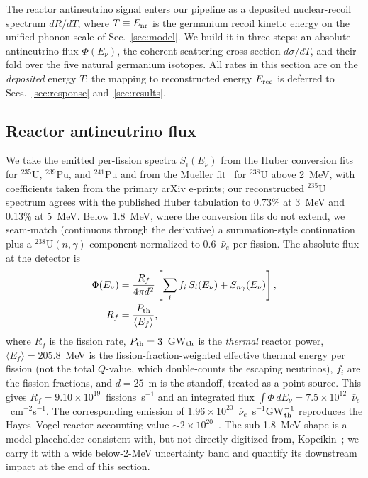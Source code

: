 The reactor antineutrino signal enters our pipeline as a deposited nuclear-recoil spectrum $dR/dT$, where $T\equiv E_{\rm nr}$ is the germanium recoil kinetic energy on the unified phonon scale of Sec.~\ref{sec:model}. We build it in three steps: an absolute antineutrino flux $\Phi(E_\nu)$, the coherent-scattering cross section $d\sigma/dT$, and their fold over the five natural germanium isotopes. All rates in this section are on the \emph{deposited} energy $T$; the mapping to reconstructed energy $E_{\rm rec}$ is deferred to Secs.~\ref{sec:response} and~\ref{sec:results}.

\subsection{Reactor antineutrino flux}

We take the emitted per-fission spectra $S_i(E_\nu)$ from the Huber conversion fits~\cite{huber2011} for ${}^{235}$U, ${}^{239}$Pu, and ${}^{241}$Pu and from the Mueller fit~\cite{mueller2011} for ${}^{238}$U above 2~MeV, with coefficients taken from the primary arXiv e-prints; our reconstructed ${}^{235}$U spectrum agrees with the published Huber tabulation to 0.73\% at 3~MeV and 0.13\% at 5~MeV. Below 1.8~MeV, where the conversion fits do not extend, we seam-match (continuous through the derivative) a summation-style continuation plus a ${}^{238}$U$(n,\gamma)$ component normalized to 0.6~$\bar\nu_e$ per fission. The absolute flux at the detector is
\begin{equation}
\begin{aligned}
\Phi(E_\nu) &= \frac{R_f}{4\pi d^2}\left[\sum_i f_i\, S_i(E_\nu) + S_{n\gamma}(E_\nu)\right],\\
R_f &= \frac{P_{\rm th}}{\langle E_f\rangle},
\end{aligned}
\label{eq:flux}
\end{equation}
where $R_f$ is the fission rate, $P_{\rm th}=3$~GW$_{\rm th}$ is the \emph{thermal} reactor power, $\langle E_f\rangle=205.8$~MeV is the fission-fraction-weighted effective thermal energy per fission (not the total $Q$-value, which double-counts the escaping neutrinos), $f_i$ are the fission fractions, and $d=25$~m is the standoff, treated as a point source. This gives $R_f=9.10\times10^{19}$~fissions~s$^{-1}$ and an integrated flux $\int\Phi\,dE_\nu = 7.5\times10^{12}$~$\bar\nu_e$~cm$^{-2}$s$^{-1}$. The corresponding emission of $1.96\times10^{20}$~$\bar\nu_e$~s$^{-1}$GW$_{\rm th}^{-1}$ reproduces the Hayes--Vogel reactor-accounting value $\sim2\times10^{20}$~\cite{hayesvogel2016}. The sub-1.8~MeV shape is a model placeholder consistent with, but not directly digitized from, Kopeikin~\cite{kopeikin2012}; we carry it with a wide below-2-MeV uncertainty band and quantify its downstream impact at the end of this section.

